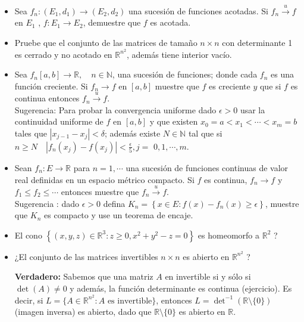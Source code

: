 \begin{itemize}
\item Sea $f_n:\left(E_1, d_1\right) \rightarrow\left(E_2, d_2\right)$ una sucesión de funciones acotadas. Si $f_n \xrightarrow{u} f$ en $E_1$ , $f: E_1 \rightarrow E_2$, demuestre que $f$ es acotada.

\item Pruebe que el conjunto de las matrices de tamaño $n \times n$ con determinante 1 es cerrado y no acotado en $\mathbb{R}^{n^2}$, además tiene interior vacío.

\item Sea $f_n[a, b] \rightarrow \mathbb{R}, \quad n \in \mathbb{N}$, una sucesión de funciones; donde cada $f_n$ es una función creciente. Si $f_n \rightarrow f$ en $[a, b]$ muestre que $f$ es creciente $y$ que si $f$ es continua entonces $f_n \xrightarrow{u} f$.\\

Sugerencia: Para probar la convergencia uniforme dado $\epsilon>0$ usar la continuidad uniforme de $f$ en $[a, b]$ y que existen $x_0=a<x_1<\cdots<x_m=b$ tales que $\left|x_{j-1}-x_j\right|<\delta$; además existe $N \in \mathbb{N}$ tal que si $n \geq N \quad\left|f_n\left(x_j\right)-f\left(x_j\right)\right|<\frac{\epsilon}{5}, j=$ $0,1, \cdots, m$.

\item Sean $f_n: E \rightarrow \mathbb{R}$ para $n=1, \cdots$ una sucesión de funciones continuas de valor real definidas en un espacio métrico compacto. Si $f$ es continua, $f_n \rightarrow f$ y $f_1 \leq f_2 \leq \cdots$ entonces muestre que $f_n \xrightarrow{u} f$.\\

Sugerencia : dado $\epsilon>0$ defina $K_n=\left\{x \in E: f(x)-f_n(x) \geq \epsilon\right\}$, muestre que $K_n$ es compacto y use un teorema de encaje.

\item El cono $\left\{(x, y, z) \in \mathbb{R}^3: z \geq 0, x^2+y^2-z=0\right\}$ es homeomorfo a $\mathbb{R}^2$ ?

\item ¿El conjunto de las matrices invertibles $n \times n$ es abierto en $\mathbb{R}^{n^2}$ ?

\textbf{Verdadero:} Sabemos que una matriz $A$ en invertible si y sólo si $\det(A)\neq 0$ y además, la función determinante es continua (ejercicio). Es decir, si $L=\{A\in \mathbb{R}^{n^2}:A \text{ es invertible}\}$, entonces $L=\det^{-1}(\mathbb{R}\setminus \{0\})$ (imagen inversa) es abierto, dado que $\mathbb{R}\setminus \{0\}$ es abierto en $\mathbb{R}$.


\end{itemize}
